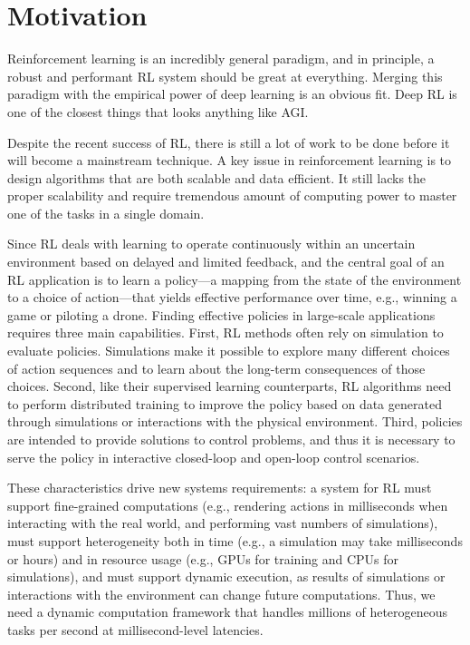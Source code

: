 \section{Motivation}

Reinforcement learning is an incredibly general paradigm, and in principle, a robust and performant RL system should be great at everything. Merging this paradigm with the empirical power of deep learning is an obvious fit. Deep RL is one of the closest things that looks anything like AGI. 

Despite the recent success of RL, there is still a lot of work to be done before it will become a mainstream technique. A key issue in reinforcement learning is to design algorithms that are both scalable and data efficient. It still lacks the proper scalability and require tremendous amount of computing power to master one of the tasks in a single domain. 

Since RL deals with learning to operate continuously within an uncertain environment based on delayed and limited feedback, and the central goal of an RL application is to learn a policy—a mapping from the state of the environment to a choice of action—that yields effective performance over time, e.g., winning a game or piloting a drone. Finding effective policies in large-scale applications requires three main capabilities. First, RL methods often rely on simulation to evaluate policies. Simulations make it possible to explore many different choices of action sequences and to learn about the long-term consequences of those choices. Second, like their supervised learning counterparts, RL algorithms need to perform distributed training to improve the policy based on data generated through simulations or interactions with the physical environment. Third, policies are intended to provide solutions to control problems, and thus it is necessary to serve the policy in interactive closed-loop and open-loop control scenarios.

These characteristics drive new systems requirements: a system for RL must support fine-grained computations (e.g., rendering actions in milliseconds when interacting with the real world, and performing vast numbers of simulations), must support heterogeneity both in time (e.g., a simulation may take milliseconds or hours) and in resource usage (e.g., GPUs for training and CPUs for simulations), and must support dynamic execution, as results of simulations or interactions with the environment can change future computations. Thus, we need a dynamic computation framework that handles millions of heterogeneous tasks per second at millisecond-level latencies.

